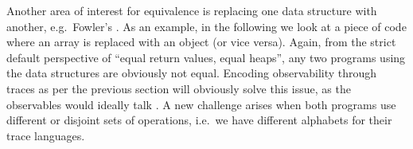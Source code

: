 Another area of interest for equivalence is replacing one data structure with another,
e.g.\ Fowler's \cite{needed}.
As an example, in the following we look at a piece of code where an array is replaced with an object (or vice versa).
Again, from the strict default perspective of ``equal return values, equal heaps'', any two programs using the data structures are obviously not equal.
Encoding observability through traces as per the previous section will obviously solve this issue, as the observables would ideally talk .
A new challenge arises when both programs use different or disjoint sets of operations, i.e.\ we have different alphabets for their trace languages.





